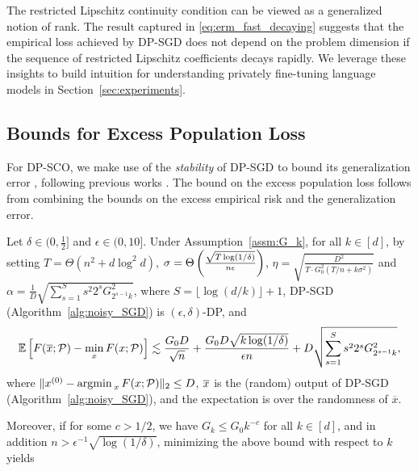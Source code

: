 

The restricted Lipschitz continuity condition can be viewed as a generalized notion of rank.
The result captured in \eqref{eq:erm_fast_decaying} suggests that the empirical loss achieved by DP-SGD does not depend on the problem dimension if the sequence of restricted Lipschitz coefficients decays rapidly. 
We leverage these insights to build intuition for understanding privately fine-tuning language models in Section~\ref{sec:experiments}.


\subsection{Bounds for Excess Population Loss}
For DP-SCO, we make use of the \emph{stability} of DP-SGD to bound its generalization error \citep{BE02}, following previous works \citep{bassily2019private,BFGT20,song2021evading}.
The bound on the excess population loss follows from combining the bounds on the excess empirical risk and the generalization error.

\begin{theo}
\label{thm:DPSCO}
Let $ \delta \in (0, \frac{1}{2}]$ and $\epsilon\in (0,10]$.
Under Assumption~\ref{assm:G_k}, for all $k \in [d]$, 
by setting
$T=\Theta(n^2 + d \log^2 d)$,
$\sigma=\Theta \left( \frac{\sqrt{T\log(1/\delta)}}{n\epsilon} \right)$, 
$\eta=\sqrt{\frac{D^{2}}{T\cdot G_{0}^{2}(T/n+k\sigma^{2})}}$
and $\alpha=\frac{1}{D}\sqrt{\sum_{s=1}^S s^2 2^{s}G_{2^{s-1}k}^{2}}$, where $S = \lfloor \log(d/k) \rfloor + 1$, 
DP-SGD (Algorithm~\ref{alg:noisy_SGD}) is $(\epsilon,\delta)$-DP, and
\begin{align*}
\mathbb{E} \left[
    F(\overline{x}; \mathcal P) - \min_{x} F(x; \mathcal P)
\right]
\lesssim
    \frac{G_0D}{\sqrt{n}}+\frac{G_{0}D\sqrt{k\log(1/\delta)}}{\epsilon n}+D\sqrt{\sum_{s=1}^{S}s^2 2^{s}G_{2^{s-1}k}^{2}},
\end{align*}
where $\|x^{(0)}- \mathop{\mathrm{argmin\,}}_x F(x ; \mathcal P) \|_2 \le D$, $\overline{x}$ is the (random) output of DP-SGD (Algorithm~\ref{alg:noisy_SGD}), and the expectation is over the randomness of $\overline{x}$.

Moreover, if for some $c>1/2$, we have $G_k\leq G_0 k^{-c}$ for all $k \in [d]$, and in addition $n>\epsilon^{-1}\sqrt{\log(1/\delta)}$, minimizing the above bound with respect to $k$ yields
\end{theo}

